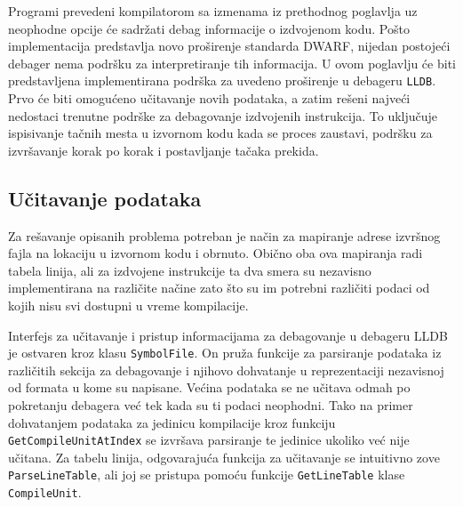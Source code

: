 \documentclass[12pt,oneside]{memoir}
\begin{document}
Programi prevedeni kompilatorom sa izmenama iz prethodnog poglavlja uz neophodne opcije će sadržati debag informacije o izdvojenom kodu.
Pošto implementacija predstavlja novo proširenje standarda DWARF, nijedan postojeći debager nema podršku za interpretiranje tih informacija.
U ovom poglavlju će biti predstavljena implementirana podrška za uvedeno proširenje u debageru \verb|LLDB|.
Prvo će biti omogućeno učitavanje novih podataka, a zatim rešeni najveći nedostaci trenutne podrške za debagovanje izdvojenih instrukcija.
To uključuje ispisivanje tačnih mesta u izvornom kodu kada se proces zaustavi, podršku za izvršavanje korak po korak i postavljanje tačaka prekida.


\subsection{Učitavanje podataka}

\label{sec:debugger_loading}

Za rešavanje opisanih problema potreban je način za mapiranje adrese izvršnog fajla na lokaciju u izvornom kodu i obrnuto.
Obično oba ova mapiranja radi tabela linija, ali za izdvojene instrukcije ta dva smera su nezavisno implementirana na različite načine zato što su im potrebni različiti podaci od kojih nisu svi dostupni u vreme kompilacije.

Interfejs za učitavanje i pristup informacijama za debagovanje u debageru LLDB je ostvaren kroz klasu \verb|SymbolFile|.
On pruža funkcije za parsiranje podataka iz različitih sekcija za debagovanje i njihovo dohvatanje u reprezentaciji nezavisnoj od formata u kome su napisane.
Većina podataka se ne učitava odmah po pokretanju debagera već tek kada su ti podaci neophodni.
Tako na primer dohvatanjem podataka za jedinicu kompilacije kroz funkciju \verb|GetCompileUnitAtIndex| se izvršava parsiranje te jedinice ukoliko već nije učitana.
Za tabelu linija, odgovarajuća funkcija za učitavanje se intuitivno zove \verb|ParseLineTable|, ali joj se pristupa pomoću funkcije \verb|GetLineTable| klase \verb|CompileUnit|.
\end{document}

